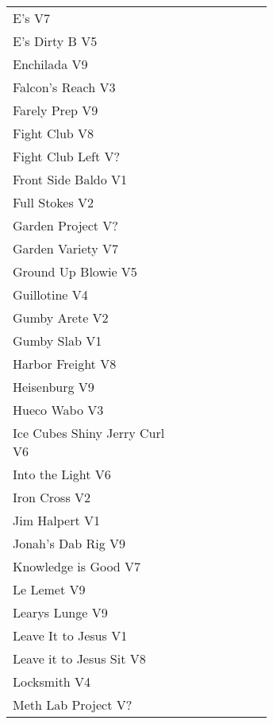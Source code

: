 \begin{center}
\begin{supertabular}{p{0.65\linewidth}r}
E's V7 & \pageref{rt:E's} \\
E's Dirty B V5 & \pageref{rt:E's Dirty B} \\
Enchilada V9 & \pageref{rt:Enchilada} \\
Falcon's Reach V3 & \pageref{rt:Falcon's Reach} \\
Farely Prep V9 & \pageref{rt:Farely Prep} \\
Fight Club V8 & \pageref{rt:Fight Club} \\
Fight Club Left V? & \pageref{rt:Fight Club Left} \\
Front Side Baldo V1 & \pageref{rt:Front Side Baldo} \\
Full Stokes V2 & \pageref{rt:Full Stokes} \\
Garden Project V? & \pageref{rt:Garden Project} \\
Garden Variety V7 & \pageref{rt:Garden Variety} \\
Ground Up Blowie V5 & \pageref{rt:Ground Up Blowie} \\
Guillotine V4 & \pageref{rt:Guillotine} \\
Gumby Arete V2 & \pageref{rt:Gumby Arete} \\
Gumby Slab V1 & \pageref{rt:Gumby Slab} \\
Harbor Freight V8 & \pageref{vr:Harbor Freight} \\
Heisenburg V9 & \pageref{rt:Heisenburg} \\
Hueco Wabo V3 & \pageref{rt:Hueco Wabo} \\
Ice Cubes Shiny Jerry Curl V6 & \pageref{rt:Ice Cubes Shiny Jerry Curl} \\
Into the Light V6 & \pageref{rt:Into the Light} \\
Iron Cross V2 & \pageref{vr:Iron Cross} \\
Jim Halpert V1 & \pageref{rt:Jim Halpert} \\
Jonah's Dab Rig V9 & \pageref{rt:Jonah's Dab Rig} \\
Knowledge is Good V7 & \pageref{rt:Knowledge is Good} \\
Le Lemet V9 & \pageref{rt:Le Lemet} \\
Learys Lunge V9 & \pageref{rt:Learys Lunge} \\
Leave It to Jesus V1 & \pageref{rt:Leave It to Jesus} \\
Leave it to Jesus Sit V8 & \pageref{vr:Leave it to Jesus Sit} \\
Locksmith V4 & \pageref{rt:Locksmith} \\
Meth Lab Project V? & \pageref{rt:Meth Lab Project} \\

\end{supertabular}
\end{center}
